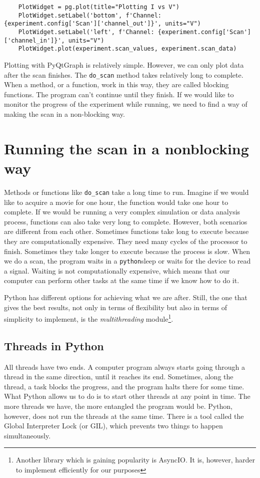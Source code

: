 \begin{verbatim}
    PlotWidget = pg.plot(title="Plotting I vs V")
    PlotWidget.setLabel('bottom', f'Channel: {experiment.config['Scan']['channel_out']}', units="V")
    PlotWidget.setLabel('left', f'Channel: {experiment.config['Scan']['channel_in']}', units="V")
    PlotWidget.plot(experiment.scan_values, experiment.scan_data)
\end{verbatim}

Plotting with PyQtGraph is relatively simple. However, we can only plot data after the scan finishes. The \texttt{do\_scan} method takes relatively long to complete. When a method, or a function, work in this way, they are called blocking functions. The program can't continue until they finish. If we would like to monitor the progress of the experiment while running, we need to find a way of making the scan in a non-blocking way.

\section{Running the scan in a nonblocking way}\label{section:nonblocking}
Methods or functions like \texttt{do\_scan} take a long time to run. Imagine if we would like to acquire a movie for one hour, the function would take one hour to complete. If we would be running a very complex simulation or data analysis process, functions can also take very long to complete. However, both scenarios are different from each other. Sometimes functions take long to execute because they are computationally expensive. They need many cycles of the processor to finish. Sometimes they take longer to execute because the process is slow. When we do a scan, the program waits in a \texttt{python}{sleep} or waits for the device to read a signal. Waiting is not computationally expensive, which means that our computer can perform other tasks at the same time if we know how to do it.

Python has different options for achieving what we are after. Still, the one that gives the best results, not only in terms of flexibility but also in terms of simplicity to implement, is the \emph{multithreading} module\footnote{Another library which is gaining popularity is AsyncIO. It is, however, harder to implement efficiently for our purposes}.

\subsection{Threads in Python}\label{subsection:multithreading}
All threads have two ends. A computer program always starts going through a thread in the same direction, until it reaches its end. Sometimes, along the thread, a task blocks the progress, and the program halts there for some time. What Python allows us to do is to start other threads at any point in time. The more threads we have, the more entangled the program would be. Python, however, does not run the threads at the same time. There is a tool called the Global Interpreter Lock (or GIL), which prevents two things to happen simultaneously.

